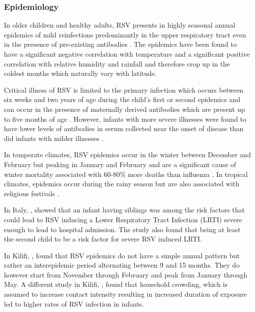 \documentclass[10pt, a4paper]{article}
\begin{document}
\subsubsection{Epidemiology}
\label{sec:org02f5516}
In older children and healthy adults, RSV presents in highly seasonal annual
epidemics \cite{al-toumEpidemiologyClinicalCharacteristics2006,aamirMolecularCharacterizationCirculating2013}
of mild reinfections predominantly in the upper respiratory tract even in the presence
of pre-existing antibodies
\cite{sullenderGeneticDiversityAttachment1991,caneMolecularEpidemiologyRespiratory2001}.
The epidemics have been found to have a significant negative correlation with
temperature and a significant positive correlation with relative humidity and
rainfall \cite{al-toumEpidemiologyClinicalCharacteristics2006} and therefore crop
up in the coldest months which naturally vary with latitude.

Critical illness of RSV is limited to the primary infection which occurs
between six weeks and two years of age during the child’s first or second
epidemics \cite{caneMolecularEpidemiologyRespiratory2001} and can occur in the
presence of maternally derived antibodies which are present up to five months of
age \cite{nyiroDefiningVaccinationWindow2017}.
However, infants with more severe illnesses were found to have lower levels of
antibodies in serum collected near the onset of disease than did infants with
milder illnesses \cite{caneMolecularEpidemiologyRespiratory2001}.

In temperate climates, RSV epidemics occur in the winter between December and
February but peaking in January and February \cite{al-toumEpidemiologyClinicalCharacteristics2006}
and are a significant cause of winter mortality associated with 60-80\% more
deaths than influenza \cite{nicholsonImpactInfluenzaRespiratory1996}.
In tropical climates, epidemics occur during the rainy season
\cite{al-toumEpidemiologyClinicalCharacteristics2006,aamirMolecularCharacterizationCirculating2013}
but are also associated with religious festivals
\cite{caneMolecularEpidemiologyRespiratory2001}.

In Italy, \cite{rossiRiskFactorsSevere2007}, showed that an infant having siblings was among
the risk factors that could lead to RSV inducing a Lower Respiratory Tract
Infection (LRTI) severe enough to lead to hospital admission.
The study also found that being at least the second child to be a risk factor
for severe RSV induced LRTI. 

In Kilifi, \cite{nokesIncidenceSeverityRespiratory2009},
found that RSV epidemics do not have a simple annual pattern but rather an
interepidemic period alternating between 9 and 15 months.
They do however start from November through February and peak from January
through May.
A different study in Kilifi, \cite{okiroFactorsAssociatedIncreased2008}, found
that household crowding, which is assumed to increase contact intensity
resulting in increased duration of exposure led to higher rates of RSV infection
in infants.
\end{document}
